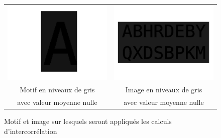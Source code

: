 \documentclass[a4paper,12pt,titlepage]{report}
\begin{document}
		\begin{figure}
		\begin{center}
		\begin{tabular}{cc}
				\includegraphics[scale=0.15]{../illus/motifm0.png} & \includegraphics[scale=0.4]{../illus/motm0.png}\\
				Motif en niveaux de gris  & Image en niveaux de gris \\
				avec valeur moyenne nulle & avec valeur moyenne nulle\\
		\end{tabular}	
		\end{center}
		\vspace{-1em}
		\caption{Motif et image sur lesquels seront appliqués les calculs d'intercorrélation}
		\end{figure}
\end{document}
